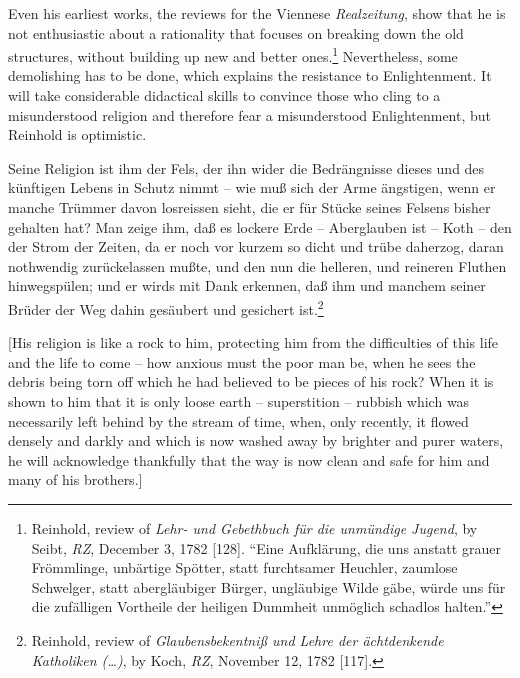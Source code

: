  Even his earliest works, the reviews for the Viennese \textit{Realzeitung}, show that he is not enthusiastic about a rationality that focuses on breaking down the old structures, without building up new and better ones.\footnote{ Reinhold, review of \textit{Lehr{-} und Gebethbuch f\"{u}r die unm\"{u}ndige Jugend}, by Seibt, \textit{RZ}, December 3, 1782 [128]. ``Eine Aufkl\"{a}rung, die uns anstatt grauer Fr\"{o}mmlinge, unb\"{a}rtige Sp\"{o}tter, statt furchtsamer Heuchler, zaumlose Schwelger, statt abergl\"{a}ubiger B\"{u}rger, ungl\"{a}ubige Wilde g\"{a}be, w\"{u}rde uns f\"{u}r die zuf\"{a}lligen Vortheile der heiligen Dummheit unm\"{o}glich schadlos halten.''} Nevertheless, some demolishing has to be done, which explains the resistance to Enlightenment. It will take considerable didactical skills to convince those who cling to a misunderstood religion and therefore fear a misunderstood Enlightenment, but Reinhold is optimistic. 

 Seine Religion ist ihm der Fels, der ihn wider die Bedr\"{a}ngnisse dieses und des k\"{u}nftigen Lebens in Schutz nimmt {--} wie mu\ss{} sich der Arme \"{a}ngstigen, wenn er manche Tr\"{u}mmer davon losreissen sieht, die er f\"{u}r St\"{u}cke seines Felsens bisher gehalten hat? Man zeige ihm, da\ss{} es lockere Erde {--} Aberglauben ist {--} Koth {--} den der Strom der Zeiten, da er noch vor kurzem so dicht und tr\"{u}be daherzog, daran nothwendig zur\"{u}ckelassen mu\ss{}te, und den nun die helleren, und reineren Fluthen hinwegsp\"{u}len; und er wirds mit Dank erkennen, da\ss{} ihm und manchem seiner Br\"{u}der der Weg dahin ges\"{a}ubert und gesichert ist.\footnote{ Reinhold, review of \textit{Glaubensbekentni\ss{} und Lehre der \"{a}chtdenkende Katholiken (\ldots )}, by Koch, \textit{RZ}, November 12, 1782 [117].}

[His religion is like a rock to him, protecting him from the difficulties of this life and the life to come {--} how anxious must the poor man be, when he sees the debris being torn off which he had believed to be pieces of his rock? When it is shown to him that it is only loose earth {--} superstition {--} rubbish which was necessarily left behind by the stream of time, when, only recently, it flowed densely and darkly and which is now washed away by brighter and purer waters, he will acknowledge thankfully that the way is now clean and safe for him and many of his brothers.]

